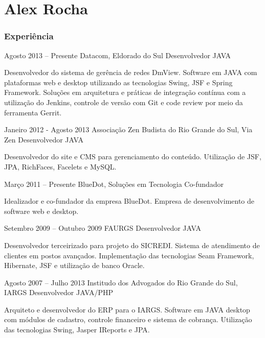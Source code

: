 \documentclass{tccv}
\begin{document}
\part{Alex Rocha}

\section{Experiência}

\begin{eventlist}

\item{Agosto 2013 -- Presente}
    {Datacom, Eldorado do Sul}
    {Desenvolvedor JAVA}

    Desenvolvedor do sistema de gerência de redes DmView. Software em JAVA
    com plataformas web e desktop utilizando as tecnologias Swing, JSF e 
    Spring Framework. Soluções em arquitetura e práticas de integração 
    contínua com a utilização do Jenkins, controle de versão com Git e
    code review por meio da ferramenta Gerrit.

\item{Janeiro 2012 - Agosto 2013}
    {Associação Zen Budista do Rio Grande do Sul, Via Zen}
    {Desenvolvedor JAVA}

    Desenvolvedor do site e CMS para gerenciamento do conteúdo.
    Utilização de JSF, JPA, RichFaces, Facelets e MySQL.

\item{Março 2011 -- Presente}
    {BlueDot, Soluções em Tecnologia}
    {Co-fundador}

    Idealizador e co-fundador da empresa BlueDot. Empresa de desenvolvimento de software
    web e desktop.

\item{Setembro 2009 -- Outubro 2009}
    {FAURGS}
    {Desenvolvedor JAVA}

    Desenvolvedor terceirizado para projeto do SICREDI\@. Sistema de atendimento de clientes em
    postos avançados. Implementação das tecnologias Seam Framework, Hibernate, JSF e
    utilização de banco Oracle.

\item{Agosto 2007 -- Julho 2013}
    {Institudo dos Advogados do Rio Grande do Sul, IARGS}
    {Desenvolvedor JAVA/PHP}

    Arquiteto e desenvolvedor do ERP para o IARGS\@. Software em JAVA desktop
    com módulos de cadastro, controle financeiro e sistema de cobrança. Utilização
    das tecnologias Swing, Jasper IReports e JPA.

\end{eventlist}
\end{document}
